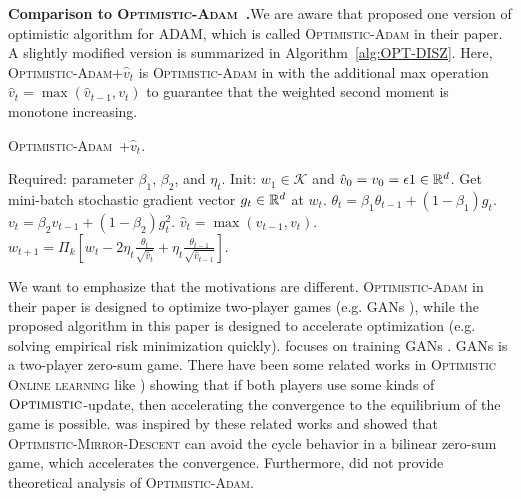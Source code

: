 \documentclass[11pt]{article}
\def\K{\mathcal{K}}
\theoremstyle{k}
\begin{document}
\textbf{Comparison to \textsc{Optimistic-Adam}~\cite{DISZ18}.}\hspace{0.1in}We are aware that \cite{DISZ18} proposed one version of optimistic algorithm for ADAM, which
is called \textsc{Optimistic-Adam} in their paper. A slightly modified version is summarized in Algorithm~\ref{alg:OPT-DISZ}. Here, \textsc{Optimistic-Adam$+\hat{v}_t$} is \textsc{Optimistic-Adam} in \cite{DISZ18} with the additional max operation $\hat{v}_t = \max ( \hat{v}_{t-1}, v_t)$ to guarantee that the weighted second moment is monotone increasing.

\begin{algorithm}[h]
\begin{algorithmic}[1]
\caption{\textsc{Optimistic-Adam~\cite{DISZ18}+$\hat{v}_t$}. \label{alg:OPT-DISZ}}
\STATE Required: parameter $\beta_1$, $\beta_2$, and $\eta_t$.
\STATE Init: $w_1 \in \K$ and $\hat{v}_0 = v_{0} = \epsilon 1 \in \mathbb{R}^{d}$.
\STATE Get mini-batch stochastic gradient vector $g_t \in \mathbb{R}^d$ at $w_t$.
\STATE $\theta_t = \beta_{1} \theta_{t-1} + (1 - \beta_{1}) g_t$.
\STATE $v_t = \beta_2 v_{t-1} + (1 - \beta_2) g_t^2$.
\STATE $\hat{v}_t = \max( \hat{v}_{t-1} , v_t )$.
\STATE $w_{t+1} = \Pi_{k}[ w_{t} - 2 \eta_t \frac{\theta_t}{ \sqrt{\hat{v}_t }}
+ \eta_t \frac{\theta_{t-1}}{ \sqrt{\hat{v}_{t-1}} }]$.
\ENDFOR
\end{algorithmic}
\end{algorithm}

We want to emphasize that the motivations are different. \textsc{Optimistic-Adam} in their paper is designed to optimize two-player games (e.g. GANs \cite{goodfellow2014generative}),
while the proposed algorithm in this paper is designed to accelerate optimization
(e.g. solving empirical risk minimization quickly).
\cite{DISZ18} focuses on training GANs \cite{goodfellow2014generative}. GANs is a two-player zero-sum game. There have been some related works in \textsc{Optimistic Online learning} like \cite{CJ12,RS13,SALS15})
showing that if both players use some kinds of $\textsc{Optimistic}$-update,
then accelerating the convergence to the equilibrium of the game is possible.
\cite{DISZ18} was inspired by these related works and showed that \textsc{Optimistic-Mirror-Descent}
can avoid the cycle behavior in a bilinear zero-sum game, which accelerates the convergence. Furthermore, \cite{DISZ18} did not provide theoretical analysis of \textsc{Optimistic-Adam}.

\end{document}
